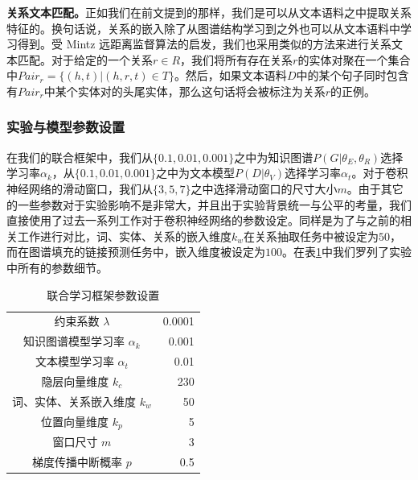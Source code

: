 \textbf{关系文本匹配。}正如我们在前文提到的那样，我们是可以从文本语料之中提取关系特征的。换句话说，关系的嵌入除了从图谱结构学习到之外也可以从文本语料中学习得到。受 Mintz \cite{mintz2009distant} 远距离监督算法的启发，我们也采用类似的方法来进行关系文本匹配。对于给定的一个关系$r \in R$，我们将所有存在关系$r$的实体对聚在一个集合中$Pair_{r} = \{(h, t) | (h, r, t) \in T \}$。然后，如果文本语料$D$中的某个句子同时包含有$Pair_{r}$中某个实体对的头尾实体，那么这句话将会被标注为关系$r$的正例。

\subsubsection{实验与模型参数设置}

在我们的联合框架中，我们从$\{0.1, 0.01, 0.001\}$之中为知识图谱$P(G|{\theta_E,\theta_R})$选择学习率$\alpha_k$，从$\{0.1, 0.01, 0.001\}$之中为文本模型$P(D|{\theta_V})$选择学习率$\alpha_t$。对于卷积神经网络的滑动窗口，我们从$\{3,5,7\}$之中选择滑动窗口的尺寸大小$m$。由于其它的一些参数对于实验影响不是非常大，并且出于实验背景统一与公平的考量，我们直接使用了过去一系列工作\cite{zeng2014relation,lin2016neural}对于卷积神经网络的参数设定。同样是为了与之前的相关工作进行对比，词、实体、关系的嵌入维度$k_w$在关系抽取任务中被设定为$50$，而在图谱填充的链接预测任务中，嵌入维度被设定为$100$。在表\ref{tab3:parameters}中我们罗列了实验中所有的参数细节。

\vspace{25pt}
\begin{table}[h]
\setlength{\abovecaptionskip}{30pt} 
\centering
\caption{联合学习框架参数设置}
\begin{tabular}{|cr|}
\hline
\multicolumn{1}{|c|}{约束系数 $\lambda$}                & 0.0001 \\
\multicolumn{1}{|c|}{知识图谱模型学习率 $\alpha_k$}        & 0.001 \\
\multicolumn{1}{|c|}{文本模型学习率 $\alpha_t$}             & 0.01  \\
\multicolumn{1}{|c|}{隐层向量维度 $k_c$}        & 230   \\
\multicolumn{1}{|c|}{词、实体、关系嵌入维度 $k_w$} & 50    \\
\multicolumn{1}{|c|}{位置向量维度 $k_p$}            & 5     \\
\multicolumn{1}{|c|}{窗口尺寸 $m$}    & 3     \\
\multicolumn{1}{|c|}{梯度传播中断概率 $p$}            & 0.5  \\
\hline
\end{tabular}
\label{tab3:parameters}
\end{table}



